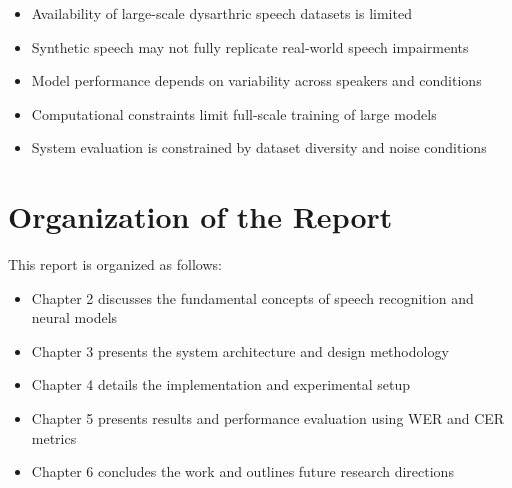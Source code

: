 \begin{itemize}
\item Availability of large-scale dysarthric speech datasets is limited
\item Synthetic speech may not fully replicate real-world speech impairments
\item Model performance depends on variability across speakers and conditions
\item Computational constraints limit full-scale training of large models
\item System evaluation is constrained by dataset diversity and noise conditions
\end{itemize}

\section{\textbf{Organization of the Report}}

This report is organized as follows:
\begin{itemize}
\item Chapter 2 discusses the fundamental concepts of speech recognition and neural models
\item Chapter 3 presents the system architecture and design methodology
\item Chapter 4 details the implementation and experimental setup
\item Chapter 5 presents results and performance evaluation using WER and CER metrics
\item Chapter 6 concludes the work and outlines future research directions
\end{itemize}